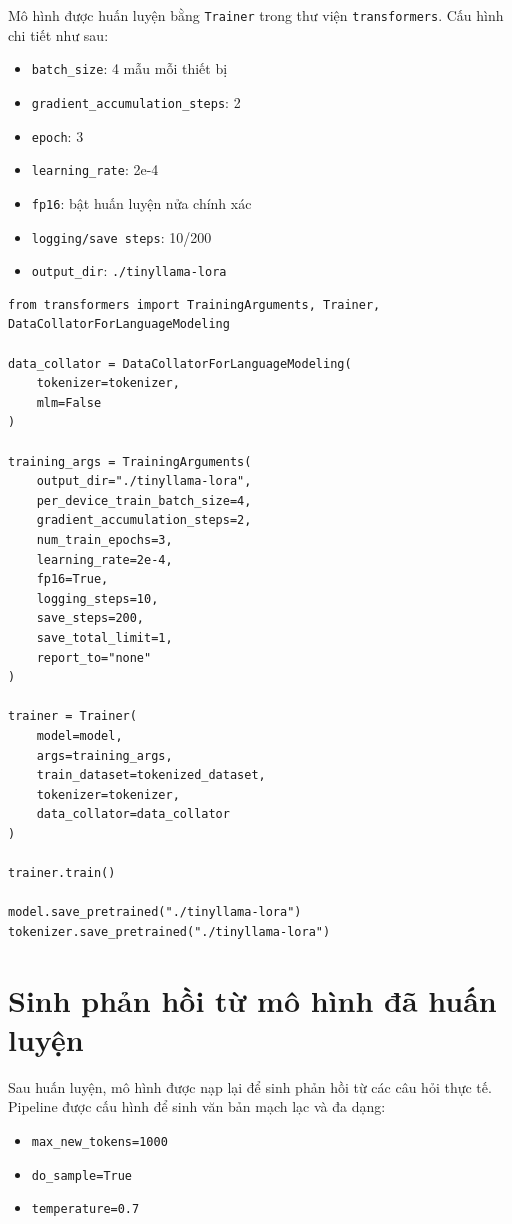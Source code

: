 \documentclass[../DoAn.tex]{subfiles}
\begin{document}
Mô hình được huấn luyện bằng \texttt{Trainer} trong thư viện \texttt{transformers}. Cấu hình chi tiết như sau:

\begin{itemize}
    \item \texttt{batch\_size}: 4 mẫu mỗi thiết bị
    \item \texttt{gradient\_accumulation\_steps}: 2
    \item \texttt{epoch}: 3
    \item \texttt{learning\_rate}: 2e-4
    \item \texttt{fp16}: bật huấn luyện nửa chính xác
    \item \texttt{logging/save steps}: 10/200
    \item \texttt{output\_dir}: \texttt{./tinyllama-lora}
\end{itemize}

\begin{lstlisting}
from transformers import TrainingArguments, Trainer, DataCollatorForLanguageModeling

data_collator = DataCollatorForLanguageModeling(
    tokenizer=tokenizer,
    mlm=False
)

training_args = TrainingArguments(
    output_dir="./tinyllama-lora",
    per_device_train_batch_size=4,
    gradient_accumulation_steps=2,
    num_train_epochs=3,
    learning_rate=2e-4,
    fp16=True,
    logging_steps=10,
    save_steps=200,
    save_total_limit=1,
    report_to="none"
)

trainer = Trainer(
    model=model,
    args=training_args,
    train_dataset=tokenized_dataset,
    tokenizer=tokenizer,
    data_collator=data_collator
)

trainer.train()

model.save_pretrained("./tinyllama-lora")
tokenizer.save_pretrained("./tinyllama-lora")
\end{lstlisting}

\section{Sinh phản hồi từ mô hình đã huấn luyện}

Sau huấn luyện, mô hình được nạp lại để sinh phản hồi từ các câu hỏi thực tế. Pipeline được cấu hình để sinh văn bản mạch lạc và đa dạng:

\begin{itemize}
    \item \texttt{max\_new\_tokens=1000}
    \item \texttt{do\_sample=True}
    \item \texttt{temperature=0.7}
\end{itemize}
\end{document}
